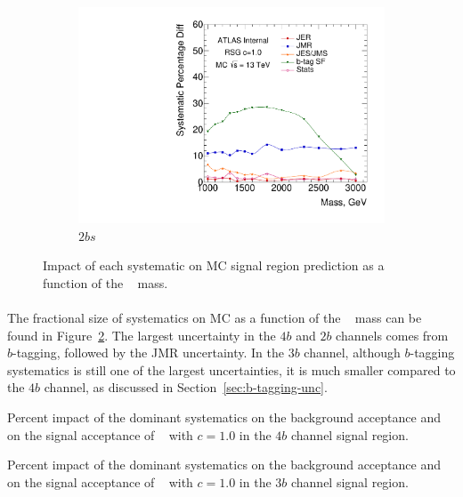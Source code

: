 \begin{figure}[htb!]
\begin{subfigure}[b]{0.45\textwidth}
        \includegraphics[width=\textwidth,angle=-90]{figures/boosted/Syst_MC/TwoTag_split_RSG_syst.pdf}
        \caption{$2bs$}
        \label{fig:signal_syst_summary-2b}
    \end{subfigure}
  \caption{Impact of each systematic on MC signal region prediction as a function of the \Grav~ mass.}
  \label{fig:signal_syst_summary}
\end{figure}

\paragraph{}
The fractional size of systematics on MC as a function of the \Grav~ mass can be found in Figure~\ref{fig:signal_syst_summary}.
The largest uncertainty in the $4b$ and $2b$ channels comes from $b$-tagging, followed by the JMR uncertainty.
In the $3b$ channel, although $b$-tagging systematics is still one of the largest uncertainties, it is much smaller compared to the $4b$ channel, as discussed in Section~\ref{sec:b-tagging-unc}. 


\begin{table}[htb!]
\begin{center}
\caption{Percent impact of the dominant systematics on the background acceptance
         and on the signal acceptance of \Grav~ with $c=1.0$ in the $4b$ channel signal region.}

\label{tab:summary-systematics-4b}
\end{center}
\end{table}

\begin{table}[htb!]
\begin{center}
\caption{Percent impact of the dominant systematics on the background acceptance
         and on the signal acceptance of \Grav~ with $c=1.0$ in the $3b$ channel signal region.}

\label{tab:summary-systematics-3b}
\end{center}
\end{table}

